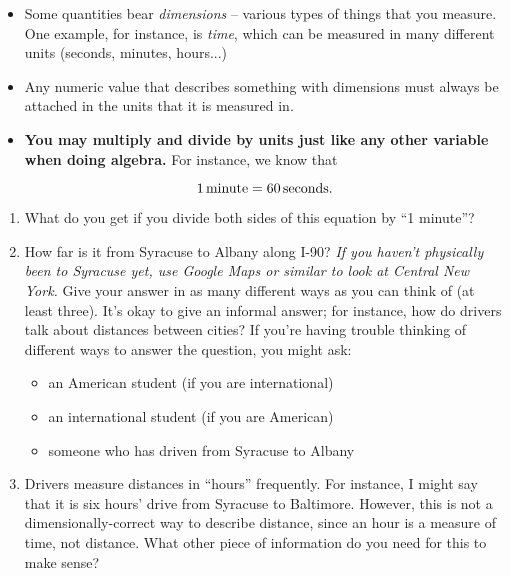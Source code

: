 \documentclass[12pt]{article}
\newcommand{\BI}{\begin{itemize}}
\newcommand{\EI}{\end{itemize}}
\begin{document}
\newpage
	

	\BI
	\item Some quantities bear {\it dimensions} -- various types of things that you measure. One example, for instance, is {\it time},
	which can be measured in many different units (seconds, minutes, hours...)
	
	\item Any numeric value that describes something with dimensions must always be attached in the units that it is measured in.
	
	\item {\bf You may multiply and divide by units just like any other variable when doing algebra.}
	For instance, we know that
	
	$$
	1 \,{\rm minute} = 60 \,{\rm seconds}.
	$$
	\EI
	
	\begin{enumerate}
		
		\item What do you get if you divide both sides of this equation by ``1 minute''?
		
		
		
		\vspace{1in}
		
		\item How far is it from Syracuse to Albany along I-90? {\it If you haven't physically been to Syracuse yet, use Google Maps or similar to look at Central New York.} Give your answer in as many different ways as you can think of
		(at least three). It's okay to give an informal answer; for instance, how do drivers talk about distances between cities?
		If you're having trouble thinking of different ways to answer the question, you might ask:
		
		\BI
		\item an American student (if you are international)
		\item an international student (if you are American)
		\item someone who has driven from Syracuse to Albany
		\EI
		
		\vspace{3in}
		
		
	\newpage
	
	

	
	\item Drivers measure distances in ``hours'' frequently. For instance, I might say that it is six hours' drive
	from Syracuse to Baltimore. However, this is not a dimensionally-correct way to describe distance, since an hour
	is a measure of time, not distance. What other piece of information do you need for this to make sense?
	

\end{enumerate}
\end{document}
